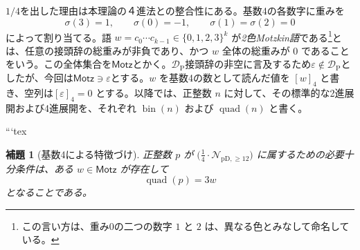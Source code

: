 \documentclass[12pt]{ltjsarticle}
\theoremstyle{plain}
\newtheorem{lemma}[theorem]{補題}
\theoremstyle{definition}
\theoremstyle{plain}
\newcommand{\DP}{\mathcal{D}_{\mathrm{P}}}
\newcommand{\Pset}{%
  \bigl(\tfrac{1}{4}\cdot\mathcal{N}_{\mathrm{pD},\geq 12}\bigr)%
}
\begin{document}
$1/4$を出した理由は本理論の４進法との整合性にある。基数4の各数字に重みを
\[
  \sigma(3)=1,\qquad \sigma(0)=-1,\qquad
  \sigma(1)=\sigma(2)=0
\]
によって割り当てる。語 $w=c_0\cdots c_{k-1}\in\{0,1,2,3\}^{k}$ が\emph{2色Motzkin語}である\footnote{この言い方は、重み0の二つの数字 $1$ と $2$ は、異なる色とみなして命名している。}とは、任意の接頭辞の総重みが非負であり、かつ $w$ 全体の総重みが $0$ であることをいう。この全体集合を$\mathsf{Motz}$とかく。$\DP$接頭辞の非空に言及するため$\varepsilon\notin\DP$としたが、今回は$\mathsf{Motz}\ni\varepsilon$とする。$w$ を基数4の数として読んだ値を $[w]_4$ と書き、空列は$[\varepsilon]_4=0$ とする。以降では、正整数 $n$ に対して、その標準的な2進展開および4進展開を、それぞれ $\operatorname{bin}(n)$ および $\operatorname{quad}(n)$ と書く。


```tex
\begin{lemma}[基数4による特徴づけ]\label{lem:base4}
正整数 $p$ が $\Pset$ に属するための必要十分条件は、ある
$w\in\mathsf{Motz}$ が存在して
\[
 \operatorname{quad}(p)=3w
\]
となることである。
\end{lemma}
\end{document}
